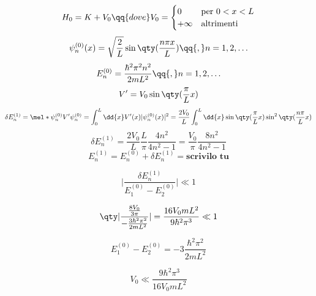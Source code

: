 \begin{soluzione}
{   \begin{equation*}
      H_0=K + V_0
      \qq{dove}
      V_0=
      \begin{cases}
         0 & \text{per } 0<x<L\\
         +\infty & \text{altrimenti}\\
      \end{cases}
   \end{equation*}
   \begin{equation*}
      \psi_n^{(0)}(x)
      =\sqrt{\frac{2}{L}} \sin{\qty( \frac{n \pi x}{L} )}
      \qq{,}
      n=1,2,\ldots
   \end{equation*}
   \begin{equation*}
      E_n^{(0)}
      =\frac{\hbar^2 \pi^2 n^2}{2mL^2}
      \qq{,}
      n=1,2,\ldots
   \end{equation*}
   \begin{equation*}
      V'=V_0\sin\qty( \frac{\pi}{L} x)
   \end{equation*}
   \begin{equation*}
      \delta E_n^{(1)}
      =\mel*{\psi_n^{(0)}}{V'}{\psi_n^{(0)}}
      =\int_{0}^{L} \dd{x} V'(x) |\psi_n^{(0)}(x)|^2
      =\frac{2V_0}{L} \int_{0}^{L} \dd{x} \sin{\qty( \frac{\pi}{L} x )} \sin^2{\qty( \frac{n\pi}{L} x )}
   \end{equation*}
   \begin{equation*}
      \delta E_n^{(1)}
      =\frac{2V_0}{L} \frac{L}{\pi} \frac{4n^2}{4n^2 - 1}
      =\frac{V_0}{\pi} \frac{8n^2}{4n^2 - 1}
   \end{equation*}
   \begin{equation*}
      E_n^{(1)}
      =E_n^{(0)} + \delta E_n^{(1)}
      =\textbf{scrivilo tu}
   \end{equation*}

   \begin{equation*}
      \biggl| \frac{\delta E_n^{(1)}}{ E_1^{(0)} - E_2^{(0)} } \biggr| \ll 1
   \end{equation*}

   \begin{equation*}
      \qty| \frac{ \frac{8V_0}{3\pi} }{ -\frac{3 \hbar^2 \pi^2}{2 m L^2} } |
      =\frac{16 V_0 m L^2}{9 \hbar^2 \pi^3}
      \ll 1
   \end{equation*}

   \begin{equation*}
      E_1^{(0)} - E_2^{(0)}
      =-3 \frac{\hbar^2 \pi^2}{2 m L^2}
   \end{equation*}

   \begin{equation*}
      V_0 \ll \frac{9 \hbar^2 \pi^3}{16 V_0 m L^2}
   \end{equation*}
   }
\end{soluzione}